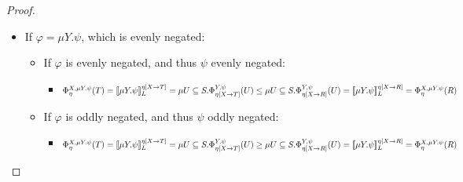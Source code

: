 \documentclass[11pt]{article}
\theoremstyle{definition}
\theoremstyle{plain}
\let\temp\phi
\let\phi\varphi
\let\varphi\temp
\begin{document}
\begin{appendices}
\begin{proof}
\begin{itemize}
\begin{itemize}
\item If $ \phi $ is evenly negated, and thus $ \psi $ evenly negated:
\begin{itemize}
\item $ \Phi_{\eta}^{X,\lbrack A \rbrack \psi}(T) = \llbracket \lbrack A \rbrack \psi \rrbracket_L^{\eta[X\rightarrow T]} = \{s\in S \vert \forall_{t\in S,a\in A} s\rightarrow t \Longrightarrow t \in \llbracket \psi \rrbracket_L^{\eta[X\rightarrow T]}\} \leq \{s\in S \vert \forall_{t\in S,a\in A} s\rightarrow t \Longrightarrow t \in \llbracket \psi \rrbracket_L^{\eta[X\rightarrow R]}\} = \llbracket \lbrack A \rbrack \psi \rrbracket_L^{\eta[X\rightarrow R]} = \Phi_{\eta}^{X,\lbrack A \rbrack \psi}(R)$
\end{itemize}
\item If $ \phi $ is oddly negated, and thus $ \psi $ oddly negated:
\begin{itemize}
\item $ \Phi_{\eta}^{X,\lbrack A \rbrack \psi}(T) = \llbracket \lbrack A \rbrack \psi \rrbracket_L^{\eta[X\rightarrow T]} = \{s\in S \vert \forall_{t\in S,a\in A} s\rightarrow t \Longrightarrow t \in \llbracket \psi \rrbracket_L^{\eta[X\rightarrow T]}\} \geq \{s\in S \vert \forall_{t\in S,a\in A} s\rightarrow t \Longrightarrow t \in \llbracket \psi \rrbracket_L^{\eta[X\rightarrow R]}\} = \llbracket \lbrack A \rbrack \psi \rrbracket_L^{\eta[X\rightarrow R]} = \Phi_{\eta}^{X,\lbrack A \rbrack \psi}(R)$
\end{itemize}
\end{itemize}
\item If $ \phi = \mu Y.\psi $, which is evenly negated:
\begin{itemize}
\item If $ \phi $ is evenly negated, and thus $ \psi $ evenly negated:
\begin{itemize}
\item $ \Phi_{\eta}^{X,\mu Y.\psi}(T) = \llbracket \mu Y.\psi \rrbracket_L^{\eta[X\rightarrow T]} = \mu U\subseteq S.\Phi_{\eta[X\rightarrow T]}^{Y,\psi}(U) \leq \\ \mu U\subseteq S.\Phi_{\eta[X\rightarrow R]}^{Y,\psi}(U) = \llbracket \mu Y.\psi \rrbracket_L^{\eta[X\rightarrow R]} = \Phi_{\eta}^{X,\mu Y.\psi}(R)$
\end{itemize}
\item If $ \phi $ is oddly negated, and thus $ \psi $ oddly negated:
\begin{itemize}
\item $ \Phi_{\eta}^{X,\mu Y.\psi}(T) = \llbracket \mu Y.\psi \rrbracket_L^{\eta[X\rightarrow T]} = \mu U\subseteq S.\Phi_{\eta[X\rightarrow T]}^{Y,\psi}(U) \geq \\ \mu U\subseteq S.\Phi_{\eta[X\rightarrow R]}^{Y,\psi}(U) = \llbracket \mu Y.\psi \rrbracket_L^{\eta[X\rightarrow R]} = \Phi_{\eta}^{X,\mu Y.\psi}(R)$

\end{itemize}
\end{itemize}
\end{itemize}
\end{proof}
\end{appendices}
\end{document}
